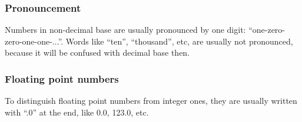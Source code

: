 \subsubsection{Pronouncement}

Numbers in non-decimal base are usually pronounced by one digit: ``one-zero-zero-one-one-...''.
Words like ``ten'', ``thousand'', etc, are usually not pronounced, because it will be confused with decimal base then.

\subsubsection{Floating point numbers}

To distinguish floating point numbers from integer ones, they are usually written with ``.0'' at the end,
like 0.0, 123.0, etc.

